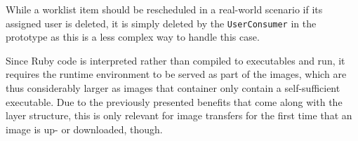   While a worklist item should be rescheduled in a real-world scenario if its assigned user is deleted, it is simply deleted by the \texttt{UserConsumer} in the prototype as this is a less complex way to handle this case.

  Since Ruby code is interpreted rather than compiled to executables and run, it requires the runtime environment to be served as part of the images, which are thus considerably larger as images that container only contain a self-sufficient executable. Due to the previously presented benefits that come along with the layer structure, this is only relevant for image transfers for the first time that an image is up- or downloaded, though.

